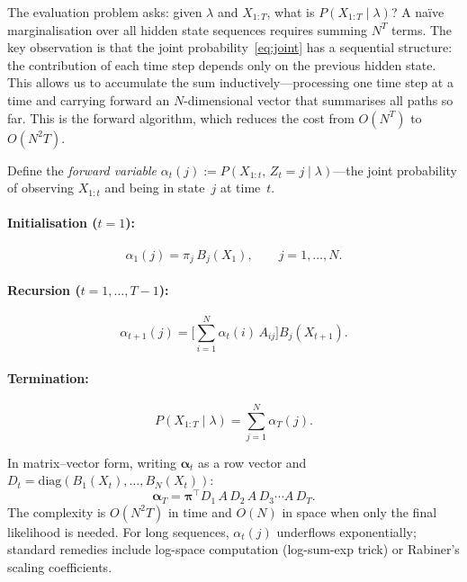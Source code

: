 \documentclass[11pt]{article}
\begin{document}
The evaluation problem asks: given $\lambda$ and $X_{1:T}$, what is $P(X_{1:T} \mid \lambda)$?  A na\"ive marginalisation over all hidden state sequences requires summing $N^T$ terms.  The key observation is that the joint probability~\eqref{eq:joint} has a sequential structure: the contribution of each time step depends only on the previous hidden state.  This allows us to accumulate the sum inductively---processing one time step at a time and carrying forward an $N$-dimensional vector that summarises all paths so far.  This is the forward algorithm, which reduces the cost from $O(N^T)$ to $O(N^2 T)$.

Define the \emph{forward variable} $\alpha_t(j) := P(X_{1:t},\, Z_t{=}j \mid \lambda)$---the joint probability of observing $X_{1:t}$ and being in state~$j$ at time~$t$.

\paragraph{Initialisation ($t=1$):}
\begin{equation}
  \alpha_1(j) = \pi_j\, B_j(X_1), \qquad j = 1,\ldots,N.
\end{equation}

\paragraph{Recursion ($t = 1,\ldots,T{-}1$):}
\begin{equation}\label{eq:forward-recursion}
  \alpha_{t+1}(j)
  = \biggl[\sum_{i=1}^{N} \alpha_t(i)\, A_{ij}\biggr] B_j(X_{t+1}).
\end{equation}

\paragraph{Termination:}
\begin{equation}
  P(X_{1:T} \mid \lambda) = \sum_{j=1}^{N} \alpha_T(j).
\end{equation}

In matrix--vector form, writing $\boldsymbol{\alpha}_t$ as a row vector and $D_t = \mathrm{diag}(B_1(X_t),\ldots,B_N(X_t))$:
\begin{equation}\label{eq:forward-matrix}
  \boldsymbol{\alpha}_T
  = \boldsymbol{\pi}^\top D_1\, A\, D_2\, A\, D_3
    \cdots A\, D_T.
\end{equation}
The complexity is $O(N^2 T)$ in time and $O(N)$ in space when only the final likelihood is needed.  For long sequences, $\alpha_t(j)$ underflows exponentially; standard remedies include log-space computation (log-sum-exp trick) or Rabiner's scaling coefficients.
\end{document}
